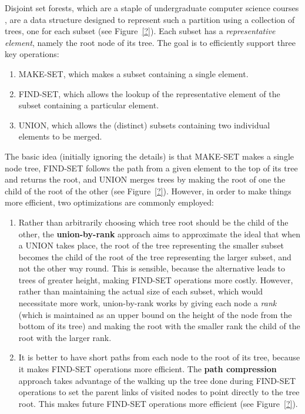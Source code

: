 \noindent Disjoint set forests, which are a staple of undergraduate computer science courses \cite{worrell06}, are a data structure designed to represent such a partition using a collection of trees, one for each subset (see Figure~\ref{?}). Each subset has a \emph{representative element}, namely the root node of its tree. The goal is to efficiently support three key operations:
%
\begin{enumerate}

\item MAKE-SET, which makes a subset containing a single element.
\item FIND-SET, which allows the lookup of the representative element of the subset containing a particular element.
\item UNION, which allows the (distinct) subsets containing two individual elements to be merged.

\end{enumerate}
%
The basic idea (initially ignoring the details) is that MAKE-SET makes a single node tree, FIND-SET follows the path from a given element to the top of its tree and returns the root, and UNION merges trees by making the root of one the child of the root of the other (see Figure~\ref{?}). However, in order to make things more efficient, two optimizations are commonly employed:
%
\begin{enumerate}

\item Rather than arbitrarily choosing which tree root should be the child of the other, the \textbf{union-by-rank} approach aims to approximate the ideal that when a UNION takes place, the root of the tree representing the smaller subset becomes the child of the root of the tree representing the larger subset, and not the other way round. This is sensible, because the alternative leads to trees of greater height, making FIND-SET operations more costly. However, rather than maintaining the actual size of each subset, which would necessitate more work, union-by-rank works by giving each node a \emph{rank} (which is maintained as an upper bound on the height of the node from the bottom of its tree) and making the root with the smaller rank the child of the root with the larger rank.

\item It is better to have short paths from each node to the root of its tree, because it makes FIND-SET operations more efficient. The \textbf{path compression} approach takes advantage of the walking up the tree done during FIND-SET operations to set the parent links of visited nodes to point directly to the tree root. This makes future FIND-SET operations more efficient (see Figure~\ref{?}).

\end{enumerate}

